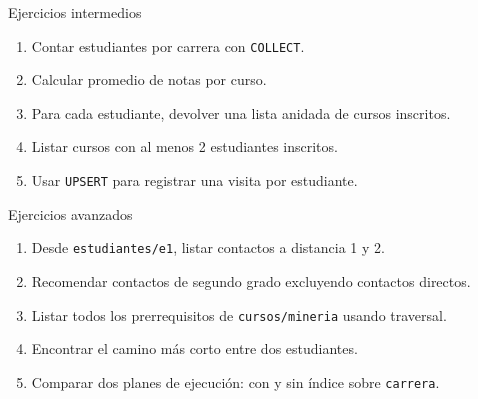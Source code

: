 \documentclass[aspectratio=169,11pt]{beamer}
\begin{document}
\begin{frame}{Ejercicios intermedios}
\begin{enumerate}
  \item Contar estudiantes por carrera con \texttt{COLLECT}.
  \item Calcular promedio de notas por curso.
  \item Para cada estudiante, devolver una lista anidada de cursos inscritos.
  \item Listar cursos con al menos 2 estudiantes inscritos.
  \item Usar \texttt{UPSERT} para registrar una visita por estudiante.
\end{enumerate}
\end{frame}

\begin{frame}{Ejercicios avanzados}
\begin{enumerate}
  \item Desde \texttt{estudiantes/e1}, listar contactos a distancia 1 y 2.
  \item Recomendar contactos de segundo grado excluyendo contactos directos.
  \item Listar todos los prerrequisitos de \texttt{cursos/mineria} usando traversal.
  \item Encontrar el camino más corto entre dos estudiantes.
  \item Comparar dos planes de ejecución: con y sin índice sobre \texttt{carrera}.
\end{enumerate}
\end{frame}

%
\end{document}
